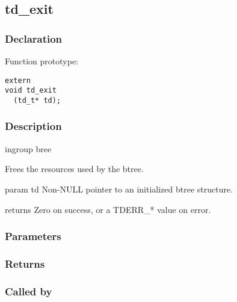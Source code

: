
\newpage
\subsection{td\_exit}
\subsubsection{Declaration} Function prototype:

\begin{verbatim}
extern
void td_exit
  (td_t* td);
\end{verbatim}

\subsubsection{Description}


 ingroup bree

 Frees the resources used by the btree.

 param td Non-NULL pointer to an initialized btree structure.

 returns Zero on success, or a TDERR\_* value on error.
 

\subsubsection{Parameters}
\subsubsection{Returns}
\subsubsection{Called by}
